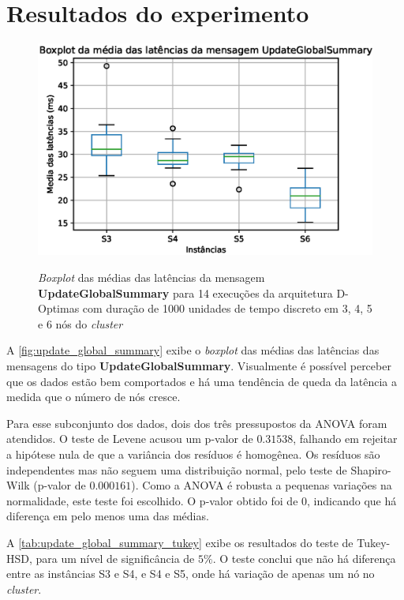 \section{Resultados do experimento}
\label{sec:resultado}

\begin{figure}
    \centering
    \caption{\textit{Boxplot} das médias das latências da mensagem \textbf{UpdateGlobalSummary} para 14 execuções da arquitetura D-Optimas com duração de 1000 unidades de tempo discreto em 3, 4, 5 e 6 nós do \textit{cluster} }
    \includegraphics[scale=0.8]{imagens/update_global_summary.eps}
    \label{fig:update_global_summary}
\end{figure}

A \autoref{fig:update_global_summary} exibe o \textit{boxplot} das médias das latências das mensagens do tipo \textbf{UpdateGlobalSummary}. Visualmente é possível perceber que os dados estão bem comportados e há uma tendência de queda da latência a medida que o número de nós cresce. 

Para esse subconjunto dos dados, dois dos três pressupostos da ANOVA foram atendidos. O teste de Levene acusou um p-valor de $0.31538$, falhando em rejeitar a hipótese nula de que a variância dos resíduos é homogênea. Os resíduos são independentes mas não seguem uma distribuição normal, pelo teste de Shapiro-Wilk (p-valor de $0.000161$). Como a ANOVA é robusta a pequenas variações na normalidade, este teste foi escolhido. O p-valor obtido foi de $0$, indicando que há diferença em pelo menos uma das médias. 

A \autoref{tab:update_global_summary_tukey} exibe os resultados do teste de Tukey-HSD, para um nível de significância de $5\%$. O teste conclui que não há diferença entre as instâncias S3 e S4, e S4 e S5, onde há variação de apenas um nó no \textit{cluster}.

